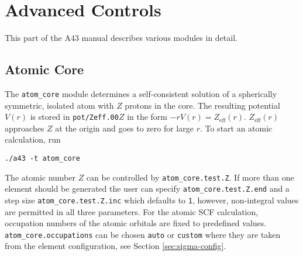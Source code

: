 \documentclass[oribibl]{llncs}
\newcommand{\um}[1]{_{\mathrm{#1}}}
\newcommand{\ttt}[1]{\texttt{#1}}
\newcommand{\codename}{A43}
\begin{document}
\newpage

\section{Advanced Controls} \label{sec:advanced-controls}
%
This part of the \codename{} manual describes
various modules in detail.


\subsection{Atomic Core} \label{sec:atom-core}
%
The \ttt{atom\_core} module determines a self-consistent solution
of a spherically symmetric, isolated atom with $Z$ protons in the core.
The resulting potential $V(r)$ is stored in \ttt{pot/Zeff.00}$Z$
in the form $-rV(r) = Z\um{eff}(r)$.
$Z\um{eff}(r)$ approaches $Z$ at the origin and goes to zero for large $r$.
To start an atomic calculation, run
\begin{verbatim}
./a43 -t atom_core
\end{verbatim}
The atomic number $Z$ can be controlled by \ttt{atom\_core.test.Z}.
If more than one element should be generated
the user can specify \ttt{atom\_core.test.Z.end} 
and a step size \ttt{atom\_core.test.Z.inc} which defaults to \ttt{1}, however,
non-integral values are permitted in all three parameters.
%
\noindent
For the atomic \ac{SCF} calculation, occupation numbers of the atomic orbitals are fixed
to predefined values. \ttt{atom\_core.occupations} can be chosen \ttt{auto}
or \ttt{custom} where they are taken from the element configuration, see Section \ref{sec:sigma-config}.
\end{document}
